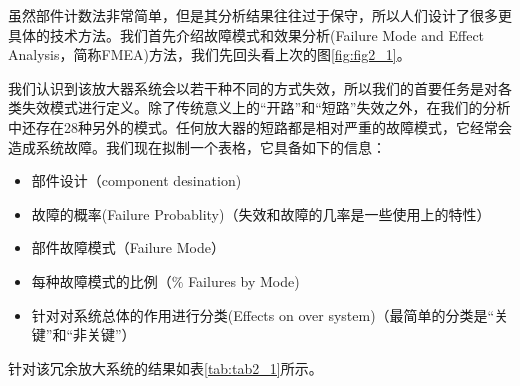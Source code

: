 \documentclass[cn,11pt,chinese]{elegantbook}
\begin{document}
虽然部件计数法非常简单，但是其分析结果往往过于保守，所以人们设计了很多更具体的技术方法。我们首先介绍故障模式和效果分析(Failure Mode and Effect Analysis，简称FMEA)方法，我们先回头看上次的图\ref*{fig:fig2_1}。

我们认识到该放大器系统会以若干种不同的方式失效，所以我们的首要任务是对各类失效模式进行定义。除了传统意义上的“开路”和“短路”失效之外，在我们的分析中还存在28种另外的模式。任何放大器的短路都是相对严重的故障模式，它经常会造成系统故障。我们现在拟制一个表格，它具备如下的信息：
\begin{itemize}
	\item 部件设计（component desination)
	\item 故障的概率(Failure Probablity)（失效和故障的几率是一些使用上的特性）
	\item 部件故障模式（Failure Mode）
	\item 每种故障模式的比例（$\%$ Failures by Mode)
	\item  针对对系统总体的作用进行分类(Effects on over system)（最简单的分类是“关键”和“非关键”）
\end{itemize}


针对该冗余放大系统的结果如表\ref{tab:tab2_1}所示。
\end{document}
